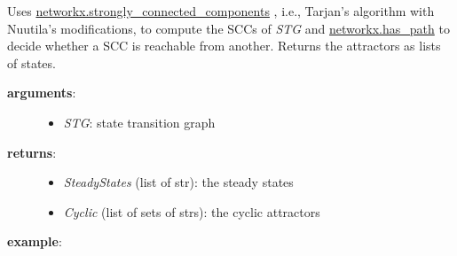 \documentclass[letterpaper,10pt,english]{sphinxmanual}
\begin{document}
\begin{fulllineitems}
\label{AttractorDetection:PyBoolNet.AttractorDetection.compute_attractors_tarjan}
Uses \href{https://networkx.github.io/documentation/latest/reference/generated/networkx.algorithms.components.strongly\_connected.strongly\_connected\_components.html}{networkx.strongly\_connected\_components}
, i.e., Tarjan's algorithm with Nuutila's modifications, to compute the SCCs of \emph{STG} and
\href{https://networkx.github.io/documentation/latest/reference/generated/networkx.algorithms.shortest\_paths.generic.has\_path.html}{networkx.has\_path}
to decide whether a SCC is reachable from another.
Returns the attractors as lists of states.
\begin{description}
\item[{\textbf{arguments}:}] \leavevmode\begin{itemize}
\item {} 
\emph{STG}: state transition graph

\end{itemize}

\item[{\textbf{returns}:}] \leavevmode\begin{itemize}
\item {} 
\emph{SteadyStates} (list of str): the steady states

\item {} 
\emph{Cyclic} (list of sets of strs): the cyclic attractors

\end{itemize}

\end{description}

\textbf{example}:


\end{fulllineitems}
\end{document}

